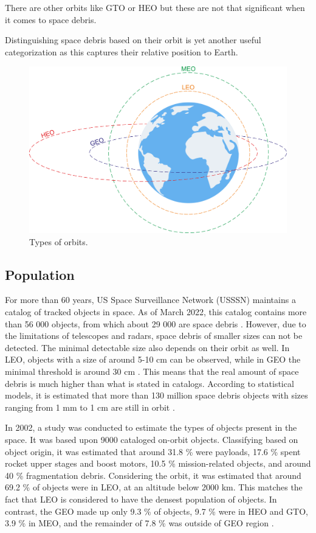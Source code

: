 There are other orbits like GTO or HEO but these are not that significant when it comes to space debris. 

Distinguishing space debris based on their orbit is yet another useful categorization as this captures their relative position to Earth. 

\begin{figure}[h]
    \centering
    \includegraphics[width=.7\textwidth]{images/orbits.png}
    \caption{Types of orbits.}
    \label{img:orbits}
\end{figure}

\subsection{Population}

For more than 60 years, US Space Surveillance Network (USSSN) maintains a catalog of tracked objects in space. As of March 2022, this catalog contains more than 56 000 objects, from which about 29 000 are space debris \cite{ESAarticle2} \cite{ESAarticle3}.
However, due to the limitations of telescopes and radars, space debris of smaller sizes can not be detected. The minimal detectable size also depends on their orbit as well. In LEO, objects with a size of around 5-10 cm can be observed, while in GEO the minimal threshold is around 30 cm \cite{klinkrad2006space} \cite{ESAarticle2}.
This means that the real amount of space debris is much higher than what is stated in catalogs. According to statistical models, it is estimated that more than 130 million space debris objects with sizes ranging from 1 mm to 1 cm are still in orbit \cite{ESAarticle3}.

In 2002, a study was conducted to estimate the types of objects present in the space. It was based upon 9000 cataloged on-orbit objects. Classifying based on object origin, it was estimated that around 31.8 \% were payloads, 17.6 \% spent rocket upper stages and boost motors, 10.5 \% mission-related objects, and around 40 \% fragmentation debris. 
Considering the orbit, it was estimated that around 69.2 \% of objects were in LEO, at an altitude below 2000 km. This matches the fact that LEO is considered to have the densest population of objects. In contrast, the GEO made up only 9.3 \% of objects, 9.7 \% were in HEO and GTO, 3.9 \% in MEO, and the remainder of  7.8 \% was outside of GEO region \cite{klinkrad2006space}.  

